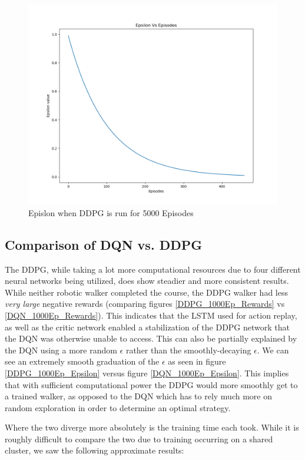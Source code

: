 \documentclass[doc, onecolumn, 12pt]{apa6}
\begin{document}
\begin{figure}
\label{DQN_5000Ep_Epsilon}
\includegraphics[width =\textwidth, height=0.4 \textheight]{results/ddpg/5000_ep/Epsilon.png}
\caption{Epislon when DDPG is run for 5000 Episodes}
\end{figure}
\FloatBarrier
\subsection{Comparison of DQN vs. DDPG}
The DDPG, while taking a lot more computational resources due to four different neural networks being utilized, does show steadier and more consistent results. While neither robotic walker completed the course, the DDPG walker had less \emph{very large} negative rewards (comparing figures \ref{DDPG_1000Ep_Rewards} vs \ref{DQN_1000Ep_Rewards}). This indicates that the LSTM used for action replay, as well as the critic network enabled a stabilization of the DDPG network that the DQN was otherwise unable to access. This can also be partially explained by the DQN using a more random $\epsilon$ rather than the smoothly-decaying $\epsilon$. We can see an extremely smooth graduation of the $\epsilon$ as seen in figure \ref{DDPG_1000Ep_Epsilon} versus figure \ref{DQN_1000Ep_Epsilon}. This implies that with sufficient computational power the DDPG would more smoothly get to a trained walker, as opposed to the DQN which has to rely much more on random exploration in order to determine an optimal strategy. 

Where the two diverge more absolutely is the training time each took. While it is roughly difficult to compare the two due to training occurring on a shared cluster, we saw the following approximate results:
\end{document}
